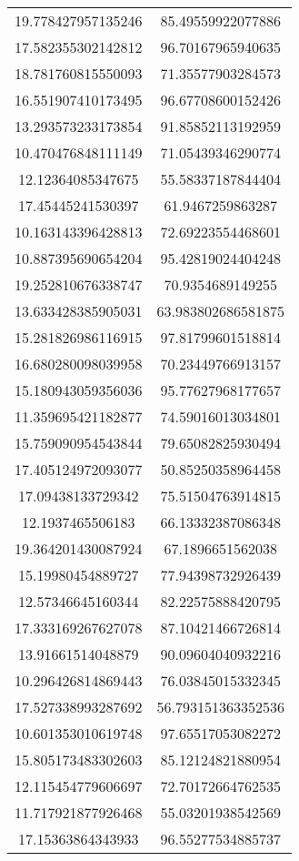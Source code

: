 \begin{table}
\begin{tabular}{cc}
19.778427957135246 & 85.49559922077886 \\
17.582355302142812 & 96.70167965940635 \\
18.781760815550093 & 71.35577903284573 \\
16.551907410173495 & 96.67708600152426 \\
13.293573233173854 & 91.85852113192959 \\
10.470476848111149 & 71.05439346290774 \\
12.12364085347675 & 55.58337187844404 \\
17.45445241530397 & 61.9467259863287 \\
10.163143396428813 & 72.69223554468601 \\
10.887395690654204 & 95.42819024404248 \\
19.252810676338747 & 70.9354689149255 \\
13.633428385905031 & 63.983802686581875 \\
15.281826986116915 & 97.81799601518814 \\
16.680280098039958 & 70.23449766913157 \\
15.180943059356036 & 95.77627968177657 \\
11.359695421182877 & 74.59016013034801 \\
15.759090954543844 & 79.65082825930494 \\
17.405124972093077 & 50.85250358964458 \\
17.09438133729342 & 75.51504763914815 \\
12.1937465506183 & 66.13332387086348 \\
19.364201430087924 & 67.1896651562038 \\
15.19980454889727 & 77.94398732926439 \\
12.57346645160344 & 82.22575888420795 \\
17.333169267627078 & 87.10421466726814 \\
13.91661514048879 & 90.09604040932216 \\
10.296426814869443 & 76.03845015332345 \\
17.527338993287692 & 56.793151363352536 \\
10.601353010619748 & 97.65517053082272 \\
15.805173483302603 & 85.12124821880954 \\
12.115454779606697 & 72.70172664762535 \\
11.717921877926468 & 55.03201938542569 \\
17.15363864343933 & 96.55277534885737 \\

\end{tabular}
\end{table}
